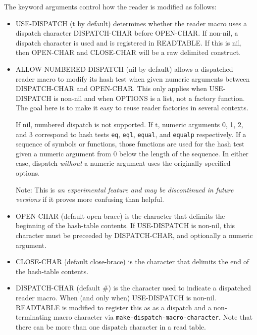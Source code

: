 \documentclass[11pt]{article}
\begin{document}
   The keyword arguments control how the reader is modified as follows:

\begin{itemize}
\item USE-DISPATCH (t by default) determines whether the reader macro uses a
     dispatch character DISPATCH-CHAR before OPEN-CHAR. If non-nil, a
     dispatch character is used and is registered in READTABLE. If this is
     nil, then OPEN-CHAR and CLOSE-CHAR will be a raw delimited construct.
\item ALLOW-NUMBERED-DISPATCH (nil by default) allows a dispatched reader
     macro to modify its hash test when given numeric arguments between
     DISPATCH-CHAR and OPEN-CHAR. This only applies when USE-DISPATCH is
     non-nil and when OPTIONS is a list, not a factory function. The goal
     here is to make it easy to reuse reader factories in several contexts.
     
     If nil, numbered dispatch is not supported. If t, numeric arguments
     0, 1, 2, and 3 correspond to hash tests \texttt{eq}, \texttt{eql}, \texttt{equal}, and 
     \texttt{equalp} respectively. If a sequence of symbols or functions, 
     those functions are used for the hash test given a numeric
     argument from 0 below the length of the sequence. In either case,
     dispatch \emph{without} a numeric argument uses the originally specified
     options.

     Note: This is \emph{an experimental feature and may be discontinued in      future versions} if it proves more confusing than helpful.
\item OPEN-CHAR (default open-brace) is the character that delimits the
     beginning of the hash-table contents. If USE-DISPATCH is non-nil,
     this character must be preceeded by DISPATCH-CHAR, and optionally
     a numeric argument.
\item CLOSE-CHAR (default close-brace) is the character that delimits
     the end of the hash-table contents.
\item DISPATCH-CHAR (default \#) is the character used to indicate a
     dispatched reader macro. When (and only when) USE-DISPATCH is non-nil.
     READTABLE is modified to register this as as a dispatch and a
     non-terminating macro character via \texttt{make-dispatch-macro-character}.
     Note that there can be more than one dispatch character in a read
     table.
\end{itemize}
\end{document}
